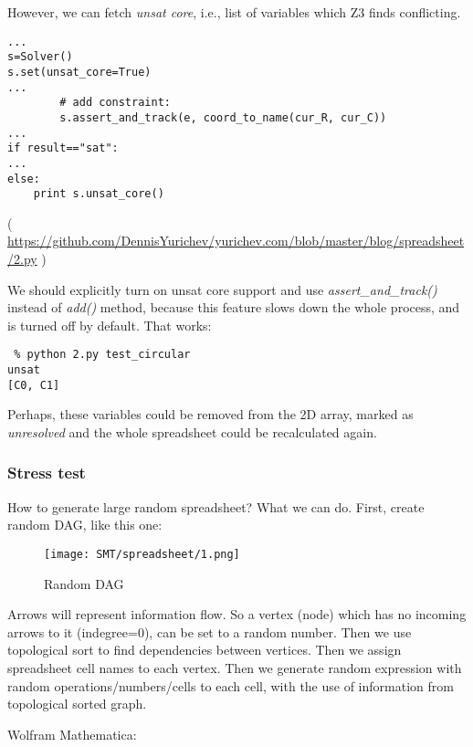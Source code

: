 However, we can fetch \textit{unsat core}, i.e., list of variables which Z3 finds conflicting.

\begin{lstlisting}
...
s=Solver()
s.set(unsat_core=True)
...
        # add constraint:
        s.assert_and_track(e, coord_to_name(cur_R, cur_C))
...
if result=="sat":
...
else:
    print s.unsat_core()
\end{lstlisting}

( \url{https://github.com/DennisYurichev/yurichev.com/blob/master/blog/spreadsheet/2.py} )

We should explicitly turn on unsat core support and use \textit{assert\_and\_track()} instead of \textit{add()} method,
because this feature slows down the whole process, and is turned off by default.
That works:

\begin{lstlisting}
 % python 2.py test_circular
unsat
[C0, C1]
\end{lstlisting}

Perhaps, these variables could be removed from the 2D array, marked as \textit{unresolved}
and the whole spreadsheet could be recalculated again.

\subsubsection{Stress test}

How to generate large random spreadsheet?
What we can do.
First, create random \ac{DAG}, like this one:

\begin{figure}[H]
\centering
\texttt{[image: SMT/spreadsheet/1.png]}
\caption{Random DAG}
\end{figure}

Arrows will represent information flow.
So a vertex (node) which has no incoming arrows to it (indegree=0), can be set to a random number.
Then we use topological sort to find dependencies between vertices.
Then we assign spreadsheet cell names to each vertex.
Then we generate random expression with random operations/numbers/cells to each cell,
with the use of information from topological sorted graph.

Wolfram Mathematica:

